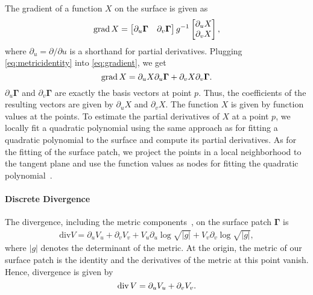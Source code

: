 \documentclass[acmtog, authorversion]{acmart}
\newcommand{\g}{\mathbf{\Gamma}}
\begin{document}
The gradient of a function $X$ on the surface is given as
\begin{equation}
    \text{grad\,} X = \begin{bmatrix} \partial_u \g & \partial_v \g\end{bmatrix}g^{-1} \begin{bmatrix} \partial_u X \\ \partial_v X\end{bmatrix},
    \label{eq:gradient}
\end{equation}
where $\partial_u = \partial / \partial u$ is a shorthand for partial derivatives. Plugging \autoref{eq:metricidentity} into \autoref{eq:gradient}, we get
\begin{equation}
    \text{grad\,} X = \partial_u X \partial_u \g + \partial_v X \partial_v \g.
\end{equation}
$\partial_u \g$ and $\partial_v \g$ are exactly the basis vectors at point $p$. Thus, the coefficients of the resulting vectors are given by $\partial_u X$ and $\partial_v X$.
The function $X$ is given by function values at the points. 
To estimate the partial derivatives of $X$ at a point $p$, we locally fit a quadratic polynomial using the same approach as for fitting a quadratic polynomial to the surface and compute its partial derivatives. 
As for the fitting of the surface patch, we project the points in a local neighborhood to the tangent plane and use the function values as nodes for fitting the quadratic polynomial~\cite{Nealen2004}.


\paragraph{Discrete Divergence}
The divergence, including the metric components~\cite{o1983semi}, on the surface patch $\g$ is 
\begin{align}
    \text{div} V = \partial_u V_u + \partial_v V_v + V_u \partial_u \log \sqrt{|g|} + V_v \partial_v \log \sqrt{|g|},
    \label{eq:div}
\end{align}
where $|g|$ denotes the determinant of the metric.
At the origin, the metric of our surface patch is the identity and the derivatives of the metric at this point vanish. Hence, divergence is given by 
\begin{equation}
    \text{div\,}V = \partial_u V_u + \partial_v V_v.
    \label{eq:divergence}
\end{equation}
\end{document}
